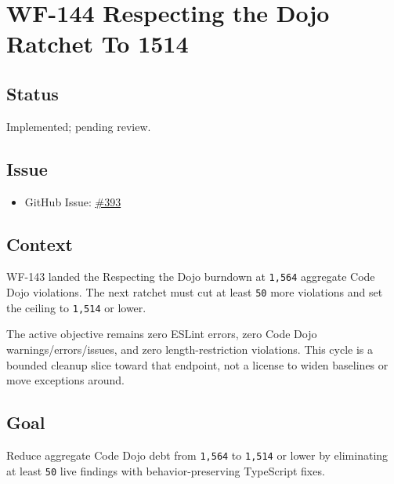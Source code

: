 \chapter{WF-144 Respecting the Dojo Ratchet To 1514}\label{record-226}

\smallskip

\section{Status}\label{record-226-status}

Implemented; pending review.

\section{Issue}\label{record-226-issue}

\begin{itemize}
\tightlist
\item
  GitHub Issue: \href{https://github.com/flyingrobots/bijou/issues/393}{\#393}
\end{itemize}

\section{Context}\label{record-226-context}

WF-143 landed the Respecting the Dojo burndown at \texttt{1\allowbreak{},\allowbreak{}5\allowbreak{}6\allowbreak{}4} aggregate Code Dojo violations. The next ratchet must cut at least \texttt{5\allowbreak{}0} more violations and set the ceiling to \texttt{1\allowbreak{},\allowbreak{}5\allowbreak{}1\allowbreak{}4} or lower.

The active objective remains zero ESLint errors, zero Code Dojo warnings/errors/issues, and zero length-restriction violations. This cycle is a bounded cleanup slice toward that endpoint, not a license to widen baselines or move exceptions around.

\section{Goal}\label{record-226-goal}

Reduce aggregate Code Dojo debt from \texttt{1\allowbreak{},\allowbreak{}5\allowbreak{}6\allowbreak{}4} to \texttt{1\allowbreak{},\allowbreak{}5\allowbreak{}1\allowbreak{}4} or lower by eliminating at least \texttt{5\allowbreak{}0} live findings with behavior-preserving TypeScript fixes.

